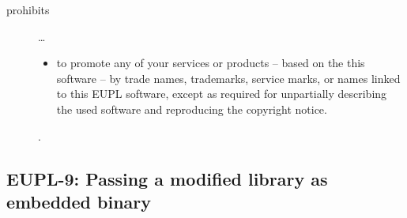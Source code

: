 \begin{description}
\begin{itemize}
\end{itemize}

\item[prohibits] \ldots
\begin{itemize}
  \item to promote any of your services or products -- based on the this software
  -- by trade names, trademarks, service marks, or names linked to this EUPL
  software, except as required for unpartially describing the used software and
  reproducing the copyright notice.
\end{itemize}.

\end{description}


\subsection{EUPL-9: Passing a modified library as embedded binary}

